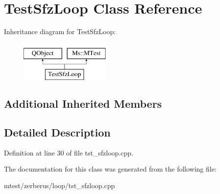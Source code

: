 \hypertarget{class_test_sfz_loop}{}\section{Test\+Sfz\+Loop Class Reference}
\label{class_test_sfz_loop}
Inheritance diagram for Test\+Sfz\+Loop\+:\begin{figure}[H]
\begin{center}
\leavevmode
\includegraphics[height=2.000000cm]{class_test_sfz_loop}
\end{center}
\end{figure}
\subsection*{Additional Inherited Members}


\subsection{Detailed Description}


Definition at line 30 of file tst\+\_\+sfzloop.\+cpp.



The documentation for this class was generated from the following file\+:\begin{DoxyCompactItemize}
\item 
mtest/zerberus/loop/tst\+\_\+sfzloop.\+cpp\end{DoxyCompactItemize}
